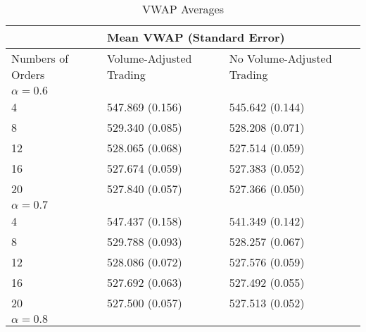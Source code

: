 \begin{table}[htbp]
\begin{center}
\caption{VWAP Averages} \label{tab:vwap_averages}
\begin{tabular}{lll}
\hline \hline
\multicolumn{1}{l|}{}                  & \multicolumn{2}{l}{Mean VWAP (Standard Error)}                                 \\ \hline
\multicolumn{1}{l|}{Numbers of Orders} & \multicolumn{1}{l|}{Volume-Adjusted Trading} & No Volume-Adjusted Trading \\ \hline
\multicolumn{3}{l}{$\alpha = 0.6$}                                                                                         \\ \hline
\multicolumn{1}{l|}{4}                 & \multicolumn{1}{l|}{547.869 (0.156)}              & 545.642 (0.144)            \\
\multicolumn{1}{l|}{8}                 & \multicolumn{1}{l|}{529.340 (0.085)}              & 528.208 (0.071)            \\
\multicolumn{1}{l|}{12}                & \multicolumn{1}{l|}{528.065 (0.068)}              & 527.514 (0.059)            \\
\multicolumn{1}{l|}{16}                & \multicolumn{1}{l|}{527.674 (0.059)}              & 527.383 (0.052)            \\
\multicolumn{1}{l|}{20}                & \multicolumn{1}{l|}{527.840 (0.057)}              & 527.366 (0.050)            \\ \hline
\multicolumn{3}{l}{$\alpha = 0.7$}                                                                                         \\ \hline
\multicolumn{1}{l|}{4}                 & \multicolumn{1}{l|}{547.437 (0.158)}              & 541.349 (0.142)            \\
\multicolumn{1}{l|}{8}                 & \multicolumn{1}{l|}{529.788 (0.093)}              & 528.257 (0.067)            \\
\multicolumn{1}{l|}{12}                & \multicolumn{1}{l|}{528.086 (0.072)}              & 527.576 (0.059)            \\
\multicolumn{1}{l|}{16}                & \multicolumn{1}{l|}{527.692 (0.063)}              & 527.492 (0.055)            \\
\multicolumn{1}{l|}{20}                & \multicolumn{1}{l|}{527.500 (0.057)}              & 527.513 (0.052)            \\ \hline
\multicolumn{3}{l}{$\alpha = 0.8$}                                                                                         \\ \hline

\end{tabular}
\end{center}
\end{table}

